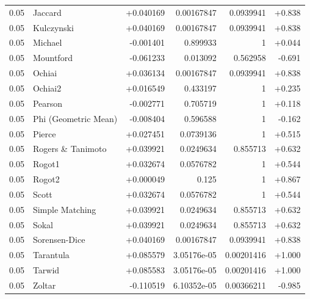 \begin{longtable}{llrrrr}
0.05 & Jaccard & +0.040169 & 0.00167847 & 0.0939941 & +0.838 \\
0.05 & Kulczynski & +0.040169 & 0.00167847 & 0.0939941 & +0.838 \\
0.05 & Michael & -0.001401 & 0.899933 & 1 & +0.044 \\
0.05 & Mountford & -0.061233 & 0.013092 & 0.562958 & -0.691 \\
0.05 & Ochiai & +0.036134 & 0.00167847 & 0.0939941 & +0.838 \\
0.05 & Ochiai2 & +0.016549 & 0.433197 & 1 & +0.235 \\
0.05 & Pearson & -0.002771 & 0.705719 & 1 & +0.118 \\
0.05 & Phi (Geometric Mean) & -0.008404 & 0.596588 & 1 & -0.162 \\
0.05 & Pierce & +0.027451 & 0.0739136 & 1 & +0.515 \\
0.05 & Rogers \& Tanimoto & +0.039921 & 0.0249634 & 0.855713 & +0.632 \\
0.05 & Rogot1 & +0.032674 & 0.0576782 & 1 & +0.544 \\
0.05 & Rogot2 & +0.000049 & 0.125 & 1 & +0.867 \\
0.05 & Scott & +0.032674 & 0.0576782 & 1 & +0.544 \\
0.05 & Simple Matching & +0.039921 & 0.0249634 & 0.855713 & +0.632 \\
0.05 & Sokal & +0.039921 & 0.0249634 & 0.855713 & +0.632 \\
0.05 & Sorensen-Dice & +0.040169 & 0.00167847 & 0.0939941 & +0.838 \\
0.05 & Tarantula & +0.085579 & 3.05176e-05 & 0.00201416 & +1.000 \\
0.05 & Tarwid & +0.085583 & 3.05176e-05 & 0.00201416 & +1.000 \\
0.05 & Zoltar & -0.110519 & 6.10352e-05 & 0.00366211 & -0.985 \\
\bottomrule
\end{longtable}
